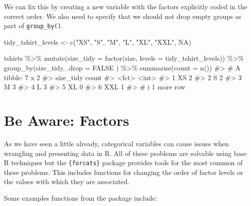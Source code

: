 \documentclass[
  letterpaper,
  DIV=11,
  numbers=noendperiod]{scrreprt}
\newenvironment{Shaded}{\begin{snugshade}}{\end{snugshade}}
\newcommand{\AttributeTok}[1]{\textcolor[rgb]{0.40,0.45,0.13}{#1}}
\newcommand{\CommentTok}[1]{\textcolor[rgb]{0.37,0.37,0.37}{#1}}
\newcommand{\ConstantTok}[1]{\textcolor[rgb]{0.56,0.35,0.01}{#1}}
\newcommand{\FunctionTok}[1]{\textcolor[rgb]{0.28,0.35,0.67}{#1}}
\newcommand{\NormalTok}[1]{\textcolor[rgb]{0.00,0.23,0.31}{#1}}
\newcommand{\OtherTok}[1]{\textcolor[rgb]{0.00,0.23,0.31}{#1}}
\newcommand{\SpecialCharTok}[1]{\textcolor[rgb]{0.37,0.37,0.37}{#1}}
\newcommand{\StringTok}[1]{\textcolor[rgb]{0.13,0.47,0.30}{#1}}
\begin{document}
We can fix this by creating a new variable with the factors explicitly
coded in the correct order. We also need to specify that we should not
drop empty groups as part of \texttt{group\_by()}.

\begin{Shaded}
\begin{Highlighting}[]
\NormalTok{tidy\_tshirt\_levels }\OtherTok{\textless{}{-}} \FunctionTok{c}\NormalTok{(}\StringTok{"XS"}\NormalTok{, }\StringTok{"S"}\NormalTok{, }\StringTok{"M"}\NormalTok{, }\StringTok{"L"}\NormalTok{, }\StringTok{"XL"}\NormalTok{, }\StringTok{"XXL"}\NormalTok{, }\ConstantTok{NA}\NormalTok{)}

\NormalTok{tshirts }\SpecialCharTok{\%\textgreater{}\%} 
  \FunctionTok{mutate}\NormalTok{(}\AttributeTok{size\_tidy =} \FunctionTok{factor}\NormalTok{(size, }\AttributeTok{levels =}\NormalTok{ tidy\_tshirt\_levels)) }\SpecialCharTok{\%\textgreater{}\%} 
  \FunctionTok{group\_by}\NormalTok{(size\_tidy, }\AttributeTok{.drop =} \ConstantTok{FALSE}\NormalTok{ ) }\SpecialCharTok{\%\textgreater{}\%} 
  \FunctionTok{summarise}\NormalTok{(}\AttributeTok{count =} \FunctionTok{n}\NormalTok{())}
\CommentTok{\#\textgreater{} \# A tibble: 7 x 2}
\CommentTok{\#\textgreater{}   size\_tidy count}
\CommentTok{\#\textgreater{}   \textless{}fct\textgreater{}     \textless{}int\textgreater{}}
\CommentTok{\#\textgreater{} 1 XS            2}
\CommentTok{\#\textgreater{} 2 S             2}
\CommentTok{\#\textgreater{} 3 M             3}
\CommentTok{\#\textgreater{} 4 L             3}
\CommentTok{\#\textgreater{} 5 XL            0}
\CommentTok{\#\textgreater{} 6 XXL           1}
\CommentTok{\#\textgreater{} \# i 1 more row}
\end{Highlighting}
\end{Shaded}

\section{Be Aware: Factors}\label{be-aware-factors}

As we have seen a little already, categorical variables can cause issues
when wrangling and presenting data in R. All of these problems are
solvable using base R techniques but the \texttt{\{forcats\}} package
provides tools for the most common of these problems. This includes
functions for changing the order of factor levels or the values with
which they are associated.

Some examples functions from the package include:
\end{document}
